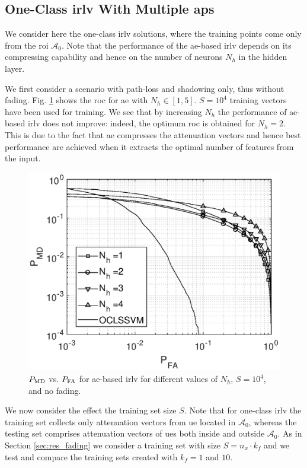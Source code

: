 \documentclass[draftcls,onecolumn,12pt]{IEEEtran}
\begin{document}
\subsection{One-Class \ac{irlv} With Multiple \acp{ap}}


We consider here the one-class \ac{irlv} solutions, where the training points come only from the \ac{roi} $\mathcal A_0$. Note that the performance of the  \ac{ae}-based \ac{irlv} depends on its compressing capability and hence on the number of neurons $N_h$ in the hidden layer.  

We first consider a scenario with path-loss and shadowing only, thus without fading. Fig. \ref{fig:aeNh} shows the \ac{roc} for \ac{ae} with $N_h \in [1, 5]$. $S=10^4$ training vectors have been used for training. We see that by increasing $N_h$ the performance of \ac{ae}-based \ac{irlv} does not improve: indeed, the optimum \ac{roc} is obtained for $N_h=2$. This is due to the fact that  \ac{ae} compresses the attenuation vectors and hence best performance are achieved when it  extracts the optimal number of features from the input.  

\begin{figure}[t]
    \centering
    \includegraphics[width=0.6\columnwidth]{res_ae_onNeur.eps}
    \caption{$P_{\rm MD}$ vs. $P_{\rm FA}$ for \ac{ae}-based \ac{irlv} for different values of $N_h$, $S=10^4$, and no fading.}
    \label{fig:aeNh}
\end{figure}
 
We now consider the effect the training set size $S$. Note that for one-class \ac{irlv} the training set collects only attenuation vectors from \ac{ue} located in $\mathcal{A}_0$, whereas the testing set comprises attenuation vectors of \acp{ue} both inside and outside $\mathcal A_0$. As in Section \ref{sec:res_fading} we consider a training set with size $S = n_x \cdot k_f$ and we test and compare the training sets created with $k_f=1$ and $10$.
\end{document}
